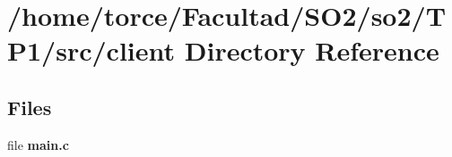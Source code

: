 \section{/home/torce/\+Facultad/\+S\+O2/so2/\+T\+P1/src/client Directory Reference}
\label{dir_6908ff505388a07996d238c763adbdab}
\subsection*{Files}
\begin{DoxyCompactItemize}
\item 
file \textbf{ main.\+c}
\end{DoxyCompactItemize}
